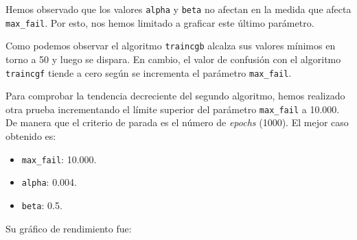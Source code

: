 \documentclass[a4paper,12pt,titlepage]{article}
\begin{document}
Hemos observado que los valores \lstinline|alpha| y \lstinline|beta| no afectan en la medida que afecta \lstinline|max_fail|. Por esto, nos hemos limitado a graficar este último parámetro.


Como podemos observar el algoritmo \lstinline|traincgb| alcalza sus valores mínimos en torno a 50 y luego se dispara. En cambio, el valor de confusión con el algoritmo \lstinline|traincgf| tiende a cero según se incrementa el parámetro \lstinline|max_fail|. 

Para comprobar la tendencia decreciente del segundo algoritmo, hemos realizado otra prueba incrementando el límite superior del parámetro \lstinline|max_fail| a 10.000. De manera que el criterio de parada es el número de \textit{epochs} (1000). El mejor caso obtenido es:

\begin{itemize}[noitemsep]
	\item \lstinline|max_fail|: 10.000.
	\item \lstinline|alpha|: 0.004.
	\item \lstinline|beta|: 0.5.
\end{itemize}

\newpage

Su gráfico de rendimiento fue:
\end{document}
